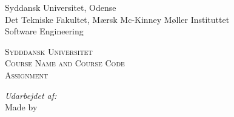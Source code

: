 \documentclass[../main.tex]{subfiles}
\begin{document}
\begin{titlepage}
\begin{center}

\noindent
\begin{minipage}{0.6\textwidth}
\begin{flushleft} 
\footnotesize
Syddansk Universitet, Odense\\
Det Tekniske Fakultet, Mærsk Mc-Kinney Møller Instituttet \\
Software Engineering\\

\end{flushleft}
\end{minipage}%
\begin{minipage}{0.4\textwidth}
\begin{flushright} 
\small

\end{flushright}
\end{minipage}

\vspace*{50px}

\textsc{\LARGE Sydddansk Universitet}\\[0.5cm]

\textsc{\Large Course Name and Course Code}\\[0.5cm]
\textsc{\Large Assignment}\\[0.5cm]


\vspace*{250px}


\noindent
\begin{minipage}{0.75\textwidth}
\begin{flushleft} 
\small
\emph{Udarbejdet af:}\\
    Made by \\
\end{flushleft}



\end{minipage}

\pagebreak

\end{center}
\end{titlepage}
\end{document}
